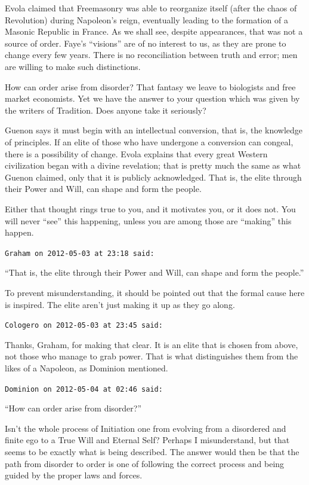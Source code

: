 \begin{footnotesize}
\begin{sffamily}
Evola claimed that Freemasonry was able to reorganize itself (after the chaos of Revolution) during Napoleon's reign, eventually leading to the formation of a Masonic Republic in France. As we shall see, despite appearances, that was not a source of order. Faye's ``visions'' are of no interest to us, as they are prone to change every few years. There is no reconciliation between truth and error; men are willing to make such distinctions.

How can order arise from disorder? That fantasy we leave to biologists and free market economists. Yet we have the answer to your question which was given by the writers of Tradition. Does anyone take it seriously?

Guenon says it must begin with an intellectual conversion, that is, the knowledge of principles. If an elite of those who have undergone a conversion can congeal, there is a possibility of change. Evola explains that every great Western civilization began with a divine revelation; that is pretty much the same as what Guenon claimed, only that it is publicly acknowledged. That is, the elite through their Power and Will, can shape and form the people.

Either that thought rings true to you, and it motivates you, or it does not. You will never ``see'' this happening, unless you are among those are ``making'' this happen.

\hfill

\texttt{Graham on 2012-05-03 at 23:18 said:}

``That is, the elite through their Power and Will, can shape and form the people.''

To prevent misunderstanding, it should be pointed out that the formal cause here is inspired. The elite aren't just making it up as they go along.

\hfill

\texttt{Cologero on 2012-05-03 at 23:45 said:}

Thanks, Graham, for making that clear. It is an elite that is chosen from above, not those who manage to grab power. That is what distinguishes them from the likes of a Napoleon, as Dominion mentioned.

\hfill

\texttt{Dominion on 2012-05-04 at 02:46 said:}

``How can order arise from disorder?''

Isn't the whole process of Initiation one from evolving from a disordered and finite ego to a True Will and Eternal Self? Perhaps I misunderstand, but that seems to be exactly what is being described. The answer would then be that the path from disorder to order is one of following the correct process and being guided by the proper laws and forces.


\end{sffamily}
\end{footnotesize}
